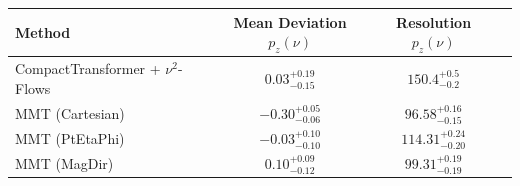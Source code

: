     \begin{tabular}{lccc}
        \toprule
        Method & Mean Deviation $p_{z}(\nu)$ & Resolution $p_{z}(\nu)$ \\
        \midrule
        CompactTransformer + $\nu^2$-Flows & $0.03^{+0.19}_{-0.15}$ & $150.4^{+0.5}_{-0.2}$ \\
        MMT (Cartesian) & $-0.30^{+0.05}_{-0.06}$ & $96.58^{+0.16}_{-0.15}$ \\
        MMT (PtEtaPhi) & $-0.03^{+0.10}_{-0.10}$ & $114.31^{+0.24}_{-0.20}$ \\
        MMT (MagDir) & $0.10^{+0.09}_{-0.12}$ & $99.31^{+0.19}_{-0.19}$ \\
        \bottomrule
    \end{tabular}